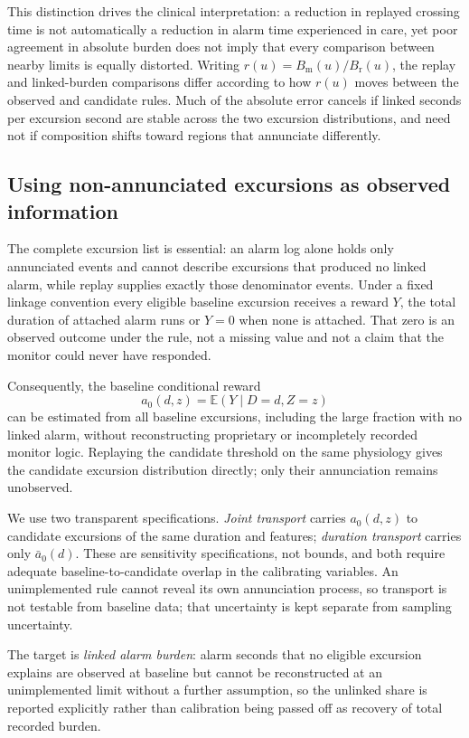 \documentclass[11pt,letterpaper]{article}
\begin{document}
This distinction drives the clinical interpretation: a reduction in replayed crossing time is not automatically a reduction in alarm time experienced in care, yet poor agreement in absolute burden does not imply that every comparison between nearby limits is equally distorted. Writing $r(u)=B_{\mathrm m}(u)/B_{\mathrm r}(u)$, the replay and linked-burden comparisons differ according to how $r(u)$ moves between the observed and candidate rules. Much of the absolute error cancels if linked seconds per excursion second are stable across the two excursion distributions, and need not if composition shifts toward regions that annunciate differently.

\subsection{Using non-annunciated excursions as observed information}\label{sec:ident}

The complete excursion list is essential: an alarm log alone holds only annunciated events and cannot describe excursions that produced no linked alarm, while replay supplies exactly those denominator events. Under a fixed linkage convention every eligible baseline excursion receives a reward $Y$, the total duration of attached alarm runs or $Y=0$ when none is attached. That zero is an observed outcome under the rule, not a missing value and not a claim that the monitor could never have responded.

Consequently, the baseline conditional reward
\[
 a_0(d,z)=\mathbb E(Y\mid D=d,Z=z)
\]
can be estimated from all baseline excursions, including the large fraction with no linked alarm, without reconstructing proprietary or incompletely recorded monitor logic. Replaying the candidate threshold on the same physiology gives the candidate excursion distribution directly; only their annunciation remains unobserved.

We use two transparent specifications. \emph{Joint transport} carries $a_0(d,z)$ to candidate excursions of the same duration and features; \emph{duration transport} carries only $\bar a_0(d)$. These are sensitivity specifications, not bounds, and both require adequate baseline-to-candidate overlap in the calibrating variables. An unimplemented rule cannot reveal its own annunciation process, so transport is not testable from baseline data; that uncertainty is kept separate from sampling uncertainty.

The target is \emph{linked alarm burden}: alarm seconds that no eligible excursion explains are observed at baseline but cannot be reconstructed at an unimplemented limit without a further assumption, so the unlinked share is reported explicitly rather than calibration being passed off as recovery of total recorded burden.
\end{document}
